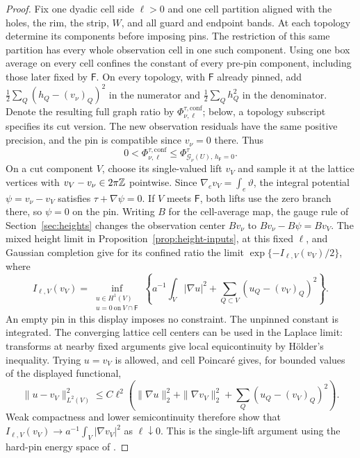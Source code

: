 \begin{proof}
Fix one dyadic cell side \(\ell>0\) and one cell partition aligned with
the holes, the rim, the strip, \(W\), and all guard and endpoint bands.
At each topology determine its components before imposing pins.  The
restriction of this same partition has every whole observation cell in
one such component.  Using one box average on every cell confines the
constant of every pre-pin component, including those later fixed by
\(\mathsf F\).  On every topology, with \(\mathsf F\)
already pinned, add \(\frac12\sum_Q(h_Q-(v_\nu)_Q)^2\) in the numerator and
\(\frac12\sum_Qh_Q^2\) in the denominator.  Denote the resulting full
graph ratio by \(\Phi^{\tau,\mathrm{conf}}_{\nu,\ell}\); below, a topology
subscript specifies its cut version.  The new observation
residuals have the same positive precision, and the pin is compatible
since \(v_\nu=0\) there.  Thus
\begin{equation}\label{geo:confinement-below-bare}
             0<\Phi^{\tau,\mathrm{conf}}_{\nu,\ell}
                 \le \Phi_{\mathcal G_\nu(U),\,h_{\mathsf F}=0}^\tau.
\end{equation}
On a cut component \(V\), choose its single-valued lift \(v_V\) and
sample it at the lattice vertices with \(v_V-v_\nu\in2\pi\mathbb Z\)
pointwise.  Since \(\nabla_e v_V=\int_e\vartheta\), the integral
potential \(\psi=v_\nu-v_V\) satisfies \(\tau+\nabla\psi=0\).
If \(V\) meets \(\mathsf F\), both lifts use the zero branch there,
so \(\psi=0\) on the pin.  Writing \(B\) for the cell-average map,
the gauge rule of Section~\ref{sec:heights} changes the observation
center \(Bv_\nu\) to \(Bv_\nu-B\psi=Bv_V\).  The mixed height limit
in Proposition~\ref{prop:height-inputs}, at this fixed \(\ell\),
and Gaussian completion give for its confined ratio the limit
\(\exp\{-I_{\ell,V}(v_V)/2\}\), where
\[
 I_{\ell,V}(v_V)=
 \inf_{\substack{u\in H^1(V)\\u=0\ \mathrm{on}\ V\cap\mathsf F}}
 \left\{a^{-1}\int_V|\nabla u|^2+
       \sum_{Q\subset V}(u_Q-(v_V)_Q)^2\right\}.
\]
An empty pin in this display imposes no constraint.  The unpinned
constant is integrated.  The converging lattice cell centers can be used
in the Laplace limit: transforms at nearby fixed arguments give local
equicontinuity by H\"older's inequality.  Trying \(u=v_V\) is allowed,
and cell Poincar\'e gives, for bounded values of the displayed functional,
\[
 \|u-v_V\|_{L^2(V)}^2
 \le C\ell^2\left(\|\nabla u\|_2^2+\|\nabla v_V\|_2^2+
                    \sum_Q(u_Q-(v_V)_Q)^2\right).
\]
Weak compactness and lower semicontinuity therefore show that
\(I_{\ell,V}(v_V)\to a^{-1}\int_V|\nabla v_V|^2\) as
\(\ell\downarrow0\).  This is the single-lift argument using the
hard-pin energy space of \cite[Theorem~3.1]{C}.


\end{proof}
